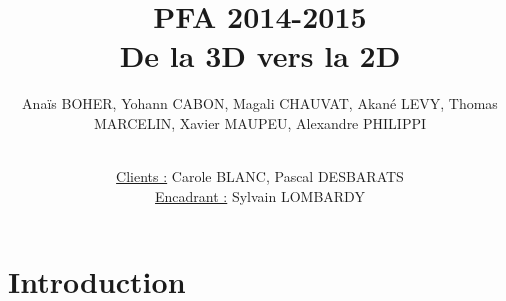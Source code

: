 \documentclass{beamer}
\title[PFA 2014-2015]{PFA 2014-2015 \\ \huge De la 3D vers la 2D} %
\author{Anaïs BOHER, Yohann CABON, Magali CHAUVAT, Akané LEVY, Thomas MARCELIN, Xavier MAUPEU, Alexandre PHILIPPI
\\ \and \\
\underline{Clients :} Carole BLANC, Pascal DESBARATS 
\\
\underline{Encadrant :} Sylvain LOMBARDY}
\institute[Enseirb-Matmeca] %
{École Nationale Supérieure d'Électronique, Informatique, Télécommunications, Mathématique et Mécanique de Bordeaux
}
\date{} %
\begin{document}
\graphicspath{{./images/}{.}}



\section{Introduction}

\begin{frame}
\titlepage %

\end{frame}


%

\end{document}
